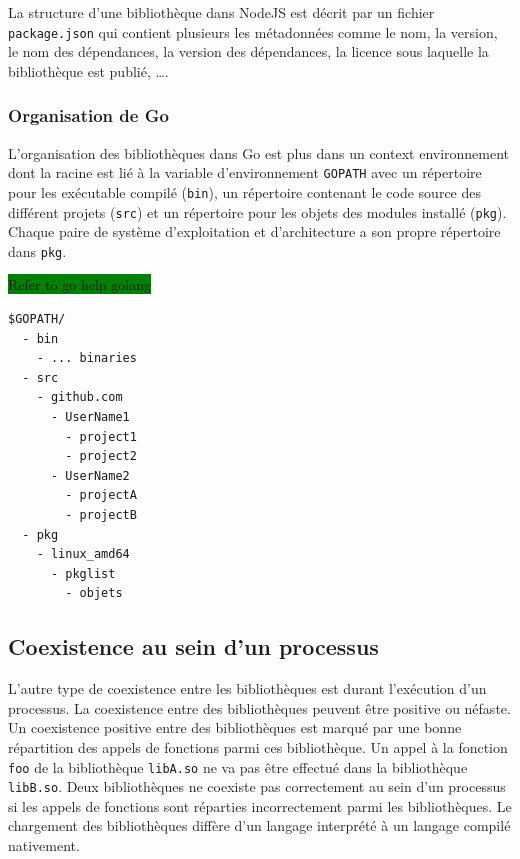 \documentclass[12pt,initial,twoside,maitrise]{dms}
\newcommand{\todo}[1]{\noindent\colorbox{green}{#1\hspace{\textwidth}}}
\numberwithin{equation}{section}
\numberwithin{table}{chapter}
\numberwithin{figure}{chapter}
\begin{document}
La structure d'une bibliothèque dans NodeJS est décrit par un fichier
\texttt{package.json} qui contient plusieurs les métadonnées comme
le nom, la version, le nom des dépendances, la version des dépendances,
la licence sous laquelle la bibliothèque est publié, \dots.


\todo{}
\subsubsection{Organisation de Go}
L'organisation des bibliothèques dans Go est plus dans un
context environnement dont la racine est lié à la variable d'environnement \texttt{GOPATH}
avec un répertoire pour les exécutable compilé (\texttt{bin}),
un répertoire contenant le code source des différent projets (\texttt{src}) et un
répertoire pour les objets des modules installé (\texttt{pkg}). Chaque paire de système
d'exploitation et d'architecture a son propre répertoire dans \texttt{pkg}.

\todo{Refer to go help golang}
\begin{verbatim}
$GOPATH/
  - bin
    - ... binaries
  - src
    - github.com
      - UserName1
        - project1
        - project2
      - UserName2
        - projectA
        - projectB
  - pkg
    - linux_amd64
      - pkglist
        - objets
\end{verbatim}



\subsection{Coexistence au sein d'un processus}
L'autre type de coexistence entre les bibliothèques est durant l'exécution d'un
processus.  La coexistence entre des bibliothèques peuvent être positive ou
néfaste.  Un coexistence positive entre des bibliothèques est marqué par une
bonne répartition des appels de fonctions parmi ces bibliothèque.  Un appel à
la fonction \verb|foo| de la bibliothèque \verb|libA.so| ne va pas être
effectué dans la bibliothèque \verb|libB.so|. Deux bibliothèques ne coexiste
pas correctement au sein d'un processus si les appels de fonctions sont
réparties incorrectement parmi les bibliothèques. Le chargement des bibliothèques
diffère d'un langage interprété à un langage compilé nativement.
\end{document}
